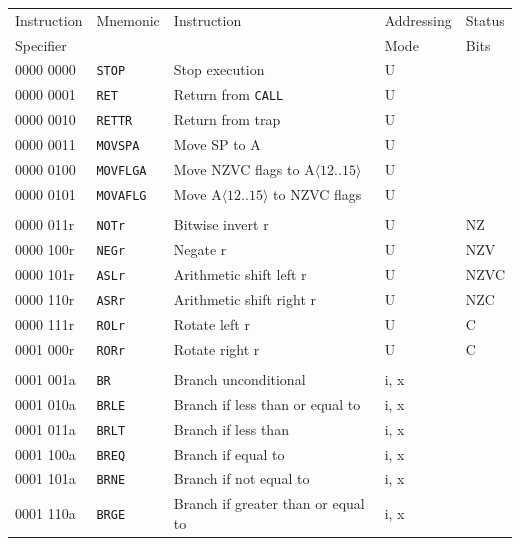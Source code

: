 \documentclass[10pt,fleqn]{book}
\begin{document}
\begin{tabular}{ l l l l l }
\toprule
Instruction & Mnemonic & Instruction & Addressing & Status\\
Specifier   &          &             & Mode       & Bits\\
\midrule

0000 0000   & \verb|STOP|    & Stop execution                       & U \\
0000 0001   & \verb|RET|     & Return from \verb|CALL|              & U \\
0000 0010   & \verb|RETTR|   & Return from trap                     & U \\
0000 0011   & \verb|MOVSPA|  & Move SP to A                         & U \\  
0000 0100   & \verb|MOVFLGA| & Move NZVC flags to A$\langle12..15\rangle$         & U \\
0000 0101   & \verb|MOVAFLG| & Move A$\langle12..15\rangle$ to NZVC flags         & U \\
 \\
0000 011r   & \verb|NOTr|    & Bitwise invert r                     & U                    & NZ \\
0000 100r   & \verb|NEGr|    & Negate r                             & U                    & NZV \\
0000 101r   & \verb|ASLr|    & Arithmetic shift left r              & U                    & NZVC \\
0000 110r   & \verb|ASRr|    & Arithmetic shift right r             & U                    & NZC \\
0000 111r   & \verb|ROLr|    & Rotate left r                        & U                    & C \\
0001 000r   & \verb|RORr|    & Rotate right r                       & U                    & C \\
 \\
0001 001a   & \verb|BR|      & Branch unconditional                 & i, x \\
0001 010a   & \verb|BRLE|    & Branch if less than or equal to      & i, x \\ 
0001 011a   & \verb|BRLT|    & Branch if less than                  & i, x \\
0001 100a   & \verb|BREQ|    & Branch if equal to                   & i, x \\ 
0001 101a   & \verb|BRNE|    & Branch if not equal to               & i, x \\ 
0001 110a   & \verb|BRGE|    & Branch if greater than or equal to   & i, x \\ 

\end{tabular}
\end{document}
